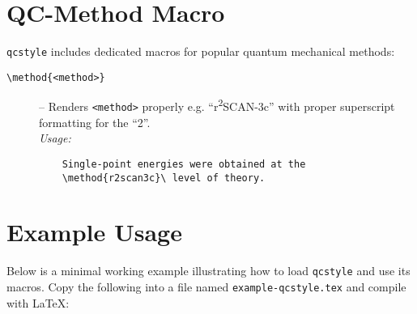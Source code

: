 \documentclass[a4paper,12pt]{article}
\begin{document}
\section{QC-Method Macro}
\label{sec:qcmethods}
\texttt{qcstyle} includes  dedicated macros for popular quantum mechanical methods:

\begin{description}
    \item[\texttt{\textbackslash method\{<method>\}}] – Renders \texttt{<method>} properly e.g. “r\textsuperscript{2}SCAN-3c” with proper superscript formatting for the “2”.\\
    \textit{Usage:}
    \begin{verbatim}
    Single-point energies were obtained at the
    \method{r2scan3c}\ level of theory.
    \end{verbatim}
\end{description}

\section{Example Usage}
\label{sec:example}
Below is a minimal working example illustrating how to load \texttt{qcstyle} and use its macros. Copy the following into a file named \texttt{example-qcstyle.tex} and compile with \LaTeX:
\end{document}
